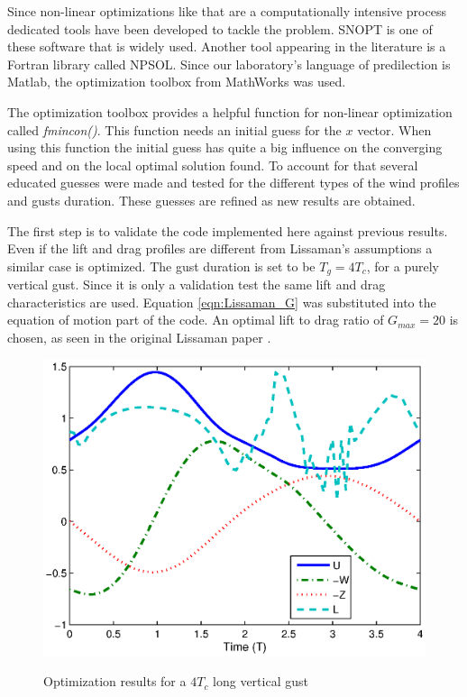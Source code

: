 \par Since non-linear optimizations like that are a computationally intensive process dedicated tools have been developed to tackle the problem.
SNOPT \cite{SNOPT} is one of these software that is widely used.
Another tool appearing in the literature is a Fortran library called NPSOL.
Since our laboratory's language of predilection is Matlab, the optimization toolbox from MathWorks was used.

\par The optimization toolbox provides a helpful function for non-linear optimization called \emph{fmincon()}.
This function needs an initial guess for the $x$ vector.
When using this function the initial guess has quite a big influence on the converging speed and on the local optimal solution found.
To account for that several educated guesses were made and tested for the different types of the wind profiles and gusts duration.
These guesses are refined as new results are obtained.


 \label{sec:results_QS}

The first step is to validate the code implemented here against previous results. 
Even if the lift and drag profiles are different from Lissaman's assumptions a similar case is optimized.
The gust duration is set to be $T_g=4 T_c$, for a purely vertical gust.
Since it is only a validation test the same lift and drag characteristics are used. Equation \ref{eqn:Lissaman_G} was substituted into the equation of motion part of the code. An optimal lift to drag ratio of $G_{max}=20$ is chosen, as seen in the original Lissaman paper \cite{Lissaman2007neutral}.

\begin{figure}[ht]
  \begin{center}	
    \scalebox{1.0}
    {\includegraphics{./Figures/Windtype=1_Tg=4_Wg=0p129_quad_G=20.eps}}
  \end{center}
  \caption{Optimization results for a $4T_c$ long vertical gust}
  \label{fig:Validation_optimization}
\end{figure}

